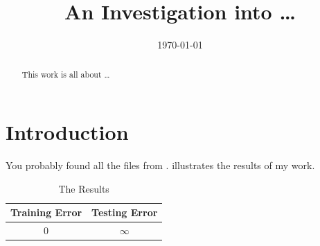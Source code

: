 \documentclass{ecsproject}     %
\begin{document}
\frontmatter
\title      {An Investigation into \dots}
\addresses  {\groupname\\\deptname\\\univname}
\date       {\today}
\subject    {}
\keywords   {}
\maketitle
\begin{abstract}
This work is all about \dots
\end{abstract}
\tableofcontents
\mainmatter

\chapter{Introduction} \label{Chapter:Introduction}
You probably found all the files from \cite{test_this_nodate}.
 illustrates the results of my work.
\begin{table}[!htb]
  \centering
  \begin{tabular}{cc}
  \toprule
  \textbf{Training Error} & \textbf{Testing Error}\\
  \midrule
  0 & $\infty$\\
  \bottomrule
  \end{tabular}
  \caption{The Results}
  \label{Table:tabex}
\end{table}
\end{document}
